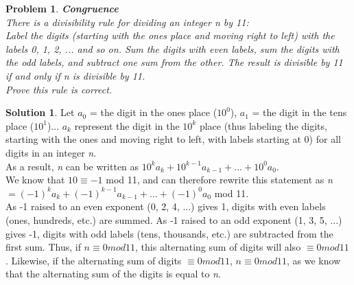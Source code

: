 \documentclass{article}
\newtheorem{problem}{Problem}
\theoremstyle{definition}
\newtheorem*{solution}{Solution}
\begin{document}
\begin{problem}\textbf{Congruence}\\
There is a divisibility rule for dividing an integer n by 11:\\
Label the digits (starting with the ones place and moving right to left) with the labels 0, 1, 2, ... and so on. Sum the digits with even labels, sum the digits with the odd labels, and subtract one sum from the other. The result is divisible by 11 if and only if n is divisible by 11.\\
Prove this rule is correct.
\end{problem}
\begin{solution}
Let $a_0$ = the digit in the ones place ($10^0$), $a_1$ = the digit in the tens place ($10^1$)... $a_k$ represent the digit in the $10^k$ place (thus labeling the digits, starting with the ones and moving right to left, with labels starting at 0) for all digits in an integer \textit{n}.\\
As a result, \textit{n} can be written as $10^ka_k + 10^{k-1}a_{k-1} + ... + 10^0a_0$.\\
We know that $10\equiv -1$ mod 11, and can therefore rewrite this statement as \textit{n} $=(-1)^ka_k + (-1)^{k-1}a_{k-1} + ... + (-1)^0a_0$ mod 11.\\
As -1 raised to an even exponent (0, 2, 4, ...) gives 1, digits with even labels (ones, hundreds, etc.) are summed. As -1 raised to an odd exponent (1, 3, 5, ...) gives -1, digits with odd labels (tens, thousands, etc.) are subtracted from the first sum. Thus, if $n\equiv 0 mod 11$, this alternating sum of digits will also $\equiv 0 mod 11$. Likewise, if the alternating sum of digits $\equiv 0 mod 11$, $n\equiv 0 mod 11$, as we know that the alternating sum of the digits is equal to \textit{n}.
\end{solution}
\end{document}
